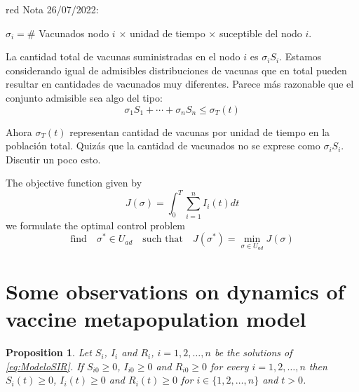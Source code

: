 \documentclass[a4paper,10pt]{article}
\newtheorem{prop}[thm]{Proposition}
\theoremstyle{remark}
\begin{document}
\begin{color}{red} Nota 26/07/2022: 

$\sigma_i = $\# Vacunados nodo  $i$ $\times $ unidad de tiempo $\times $ suceptible del nodo $i$. 

La cantidad total de vacunas suministradas en el nodo $i$ es $\sigma_iS_i$. Estamos considerando igual de admisibles distribuciones de vacunas que en total pueden resultar en cantidades de vacunados muy diferentes. Parece más razonable que el conjunto admisible sea algo del tipo:
\[ \sigma_{1}S_1+\cdots+\sigma_{n}S_n\leq \sigma_{T}(t)\]

Ahora $\sigma_T(t)$ representan cantidad de vacunas por unidad de tiempo en la población total. Quizás que la cantidad de vacunados no se exprese como $\sigma_i S_i$. Discutir un poco esto.

\end{color}

The objective function given by
\[ J(\sigma)=\int_{0}^{T} \sum_{i=1}^{n} I_{i}(t) d t\]
we formulate the optimal control problem 
\begin{equation}\label{OptimalProblem}
\text{find}\quad \sigma^{*} \in U_{a d} \quad \text{such that}\quad 
          J\left(\sigma^{*}\right)=\min _{\sigma\in  U_{a d}} J(\sigma)
\end{equation}

\section{Some observations on dynamics of vaccine metapopulation model}

\begin{prop} Let $S_i$, $I_i$ and $R_i$, $i=1,2,\ldots,n$ be the solutions of \eqref{eq:ModeloSIR}. If $S_{i0}\geq 0$, $I_{i0}\geq 0$ and $R_{i0}\geq 0$ for every $i=1,2,\ldots,n$ then $S_{i}(t)\geq 0$, $I_{i}(t)\geq 0$ and $R_{i}(t)\geq 0$ for  $i\in\{1,2,\ldots,n\}$ and  $t>0$.
\end{prop}
\end{document}
